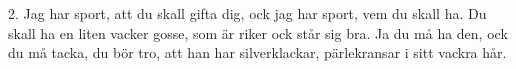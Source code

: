 2.  Jag har sport, att du skall gifta dig,
    ock jag har sport, vem du skall ha.
    Du skall ha en liten vacker gosse,
    som är riker ock står sig bra.
    Ja du må ha den, ock du må tacka,
    du bör tro, att han har silverklackar,
    pärlekransar i sitt vackra hår.
